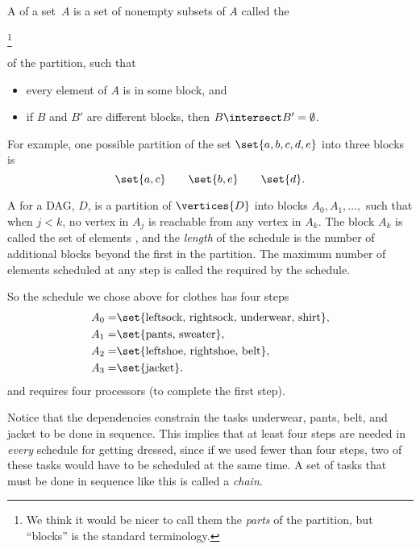 \begin{definition}\label{def:partition}
A  of a set~$A$ is a set of nonempty
subsets of $A$ called the \begin{editingnotes}
\footnote{We think it would
  be nicer to call them the \emph{parts} of the partition, but
  ``blocks'' is the standard terminology.}
\end{editingnotes} of the partition, such that
\begin{itemize}
\item every element of $A$ is in some block, and

\item if $B$ and $B'$ are different blocks, then $B \intersect B' =
  \emptyset$.

\iffalse $A= \lgunion_{B\in \mathcal{P}} B$.\fi

\end{itemize}
\end{definition}

For example, one possible partition of the set $\set{a, b, c, d, e}$
into three blocks is
\[
\set{a, c} \qquad \set{b, e} \qquad \set{d}.
\]

\begin{definition}\label{def:schedule}
A  for a DAG, $D$, is a partition of
$\vertices{D}$ into blocks $A_0, A_1,\dots,$ such that when $j < k$,
no vertex in $A_j$ is reachable from any vertex in $A_k$.  The block
$A_k$ is called the set of elements , and
the \emph{length} of the schedule is the number of additional blocks beyond the
first in the partition.  The maximum number of elements scheduled at
any step is called the  required by the
schedule.
\end{definition}

\iffalse

So the schedule we chose above for clothes has four steps
\begin{align*}
A_0 = & \set{\text{leftsock, rightsock, underwear, shirt}},\\
A_1 = & \set{\text{pants, sweater}},\\
A_2 = & \set{\text{leftshoe, rightshoe, belt}},\\
A_3 = & \set{\text{jacket}}.
\end{align*}
and requires four processors (to complete the first step).

Notice that the dependencies constrain the tasks underwear, pants,
belt, and jacket to be done in sequence.  This implies
that at least four steps are needed in \emph{every} schedule for
getting dressed, since if we used fewer than four steps, two of these
tasks would have to be scheduled at the same time.  A set of tasks
that must be done in sequence like this is called a \emph{chain}.

